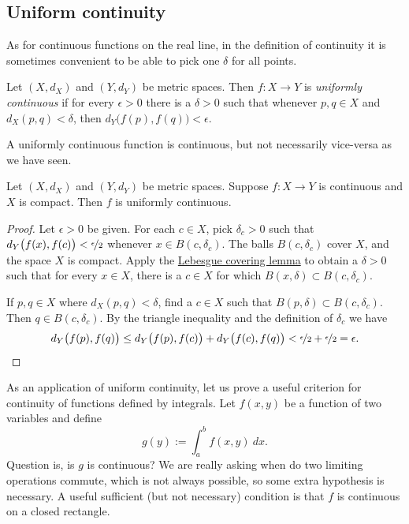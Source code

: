 \subsection{Uniform continuity}

As for continuous
functions on the real line, in the definition of continuity
it is sometimes convenient to be able to pick
one $\delta$ for all points.

\begin{defn}
Let $(X,d_X)$ and $(Y,d_Y)$ be metric spaces.
Then $f \colon X \to Y$ is
\emph{uniformly continuous}
if for every $\epsilon > 0$
there is a $\delta > 0$ such that whenever $p,q \in X$ and $d_X(p,q) <
\delta$, then
$d_Y\bigl(f(p),f(q)\bigr) < \epsilon$.
\end{defn}

A uniformly continuous function is continuous, but not necessarily
vice-versa as we have seen.

\begin{thm} \label{thm:Xcompactfunifcont}
Let $(X,d_X)$ and $(Y,d_Y)$ be metric spaces.
Suppose $f \colon X \to Y$ is continuous and $X$ is compact.  Then
$f$ is uniformly continuous.
\end{thm}

\begin{proof}
Let $\epsilon > 0$ be given.  For each $c \in X$, pick $\delta_c > 0$ such that
$d_Y\bigl(f(x),f(c)\bigr) < \nicefrac{\epsilon}{2}$
whenever
$x \in B(c,\delta_c)$.
The balls
$B(c,\delta_c)$ cover $X$, and the space $X$ is compact.  
Apply the \hyperref[ms:lebesgue]{Lebesgue covering lemma} to obtain a 
$\delta > 0$ such that for every $x \in X$, there is a $c \in X$
for which $B(x,\delta) \subset B(c,\delta_c)$.

If $p, q \in X$ where $d_X(p,q) < \delta$,
find a $c \in X$ such that $B(p,\delta) \subset B(c,\delta_c)$.
Then $q \in B(c,\delta_c)$.  By the triangle inequality
and the definition of $\delta_c$ we have
\begin{equation*}
d_Y\bigl(f(p),f(q)\bigr)
\leq
d_Y\bigl(f(p),f(c)\bigr)
+
d_Y\bigl(f(c),f(q)\bigr)
<
\nicefrac{\epsilon}{2}+
\nicefrac{\epsilon}{2} = \epsilon .  \qedhere
\end{equation*}
\end{proof}

As an application of uniform continuity, let us prove a useful criterion for
continuity of functions defined by integrals.  Let $f(x,y)$ be a function of two variables and define
\begin{equation*}
g(y) := \int_a^b f(x,y) ~dx .
\end{equation*}
Question is, is $g$ is continuous?
We are really asking when do two limiting operations commute,
which is not always possible, so some extra hypothesis
is necessary.  A useful sufficient (but not
necessary) condition is that $f$ is continuous on a closed rectangle.

